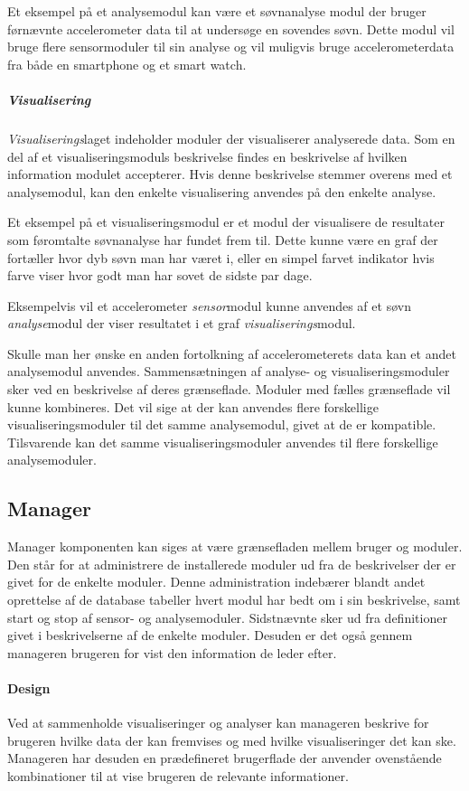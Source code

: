 Et eksempel på et analysemodul kan være et søvnanalyse modul der bruger førnævnte accelerometer data til at undersøge en sovendes søvn.
Dette modul vil bruge flere sensormoduler til sin analyse og vil muligvis bruge accelerometerdata fra både en smartphone og et smart watch.

\subparagraph{Visualisering}
\textit{Visualiserings}laget indeholder moduler der visualiserer analyserede data.
Som en del af et visualiseringsmoduls beskrivelse findes en beskrivelse af hvilken information modulet accepterer.
Hvis denne beskrivelse stemmer overens med et analysemodul, kan den enkelte visualisering anvendes på den enkelte analyse.

Et eksempel på et visualiseringsmodul er et modul der visualisere de resultater som føromtalte søvnanalyse har fundet frem til.
Dette kunne være en graf der fortæller hvor dyb søvn man har været i, eller en simpel farvet indikator hvis farve viser hvor godt man har sovet de sidste par dage.

Eksempelvis vil et accelerometer \textit{sensor}modul kunne anvendes af et søvn \textit{analyse}modul der viser resultatet i et graf \textit{visualiserings}modul.

Skulle man her ønske en anden fortolkning af accelerometerets data kan et andet analysemodul anvendes.
Sammensætningen af analyse- og visualiseringsmoduler sker ved en beskrivelse af deres grænseflade.
Moduler med fælles grænseflade vil kunne kombineres.
Det vil sige at der kan anvendes flere forskellige visualiseringsmoduler til det samme analysemodul, givet at de er kompatible.
Tilsvarende kan det samme visualiseringsmoduler anvendes til flere forskellige analysemoduler.

\subsection{Manager}\label{subsec:arkitektur-Manager}
Manager komponenten kan siges at være grænsefladen mellem bruger og moduler.
Den står for at administrere de installerede moduler ud fra de beskrivelser der er givet for de enkelte moduler.
Denne administration indebærer blandt andet oprettelse af de database tabeller hvert modul har bedt om i sin beskrivelse, samt start og stop af sensor- og analysemoduler.
Sidstnævnte sker ud fra definitioner givet i beskrivelserne af de enkelte moduler.
Desuden er det også gennem manageren brugeren for vist den information de leder efter.

\paragraph{Design}
Ved at sammenholde visualiseringer og analyser kan manageren beskrive for brugeren hvilke data der kan fremvises og med hvilke visualiseringer det kan ske.
Manageren har desuden en prædefineret brugerflade der anvender ovenstående kombinationer til at vise brugeren de relevante informationer.

